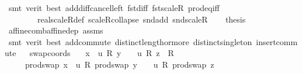 \begin{isabellebody}
\ {\isacharparenleft}{\kern0pt}smt\ {\isacharparenleft}{\kern0pt}verit{\isacharcomma}{\kern0pt}\ best{\isacharparenright}{\kern0pt}\ add{\isacharunderscore}{\kern0pt}diff{\isacharunderscore}{\kern0pt}cancel{\isacharunderscore}{\kern0pt}left{\isacharprime}{\kern0pt}\ fst{\isacharunderscore}{\kern0pt}diff\ fst{\isacharunderscore}{\kern0pt}scaleR\ prod{\isacharunderscore}{\kern0pt}eq{\isacharunderscore}{\kern0pt}iff\ \isanewline
\ \ \ \ \ \ \ \ real{\isacharunderscore}{\kern0pt}scaleR{\isacharunderscore}{\kern0pt}def\ scaleR{\isacharunderscore}{\kern0pt}collapse\ snd{\isacharunderscore}{\kern0pt}add\ snd{\isacharunderscore}{\kern0pt}scaleR{\isacharparenright}{\kern0pt}\isanewline
\ \ \isamarkupfalse%
\ {\isacharquery}{\kern0pt}thesis\ \isamarkupfalse%
\ affine{\isacharunderscore}{\kern0pt}comb{\isacharunderscore}{\kern0pt}affine{\isacharunderscore}{\kern0pt}dep\ assms{\isacharparenleft}{\kern0pt}{}{\isacharparenright}{\kern0pt}\isanewline
\ \ \ \ \isamarkupfalse%
\ {\isacharparenleft}{\kern0pt}smt\ {\isacharparenleft}{\kern0pt}verit{\isacharcomma}{\kern0pt}\ best{\isacharparenright}{\kern0pt}\ add{\isachardot}{\kern0pt}commute\ distinct{\isacharunderscore}{\kern0pt}length{\isacharunderscore}{\kern0pt}{}{\isacharunderscore}{\kern0pt}or{\isacharunderscore}{\kern0pt}more\ distinct{\isacharunderscore}{\kern0pt}singleton\ insert{\isacharunderscore}{\kern0pt}commute{\isacharparenright}{\kern0pt}\isanewline
{}\isamarkupfalse%
%
\endisatagproof
{\isafoldproof}%
%
\isadelimproof
\ \isanewline
%
\endisadelimproof
\isanewline
{}\isamarkupfalse%
\ swap{\isacharunderscore}{\kern0pt}coords{\isacharcolon}{\kern0pt}\isanewline
\ \ \ {\isachardoublequoteopen}x\ {\isacharequal}{\kern0pt}\ u\ {\isacharasterisk}{\kern0pt}\isactrlsub R\ y\ {\isacharplus}{\kern0pt}\ {\isacharparenleft}{\kern0pt}{}\ {\isacharminus}{\kern0pt}\ u{\isacharparenright}{\kern0pt}\ {\isacharasterisk}{\kern0pt}\isactrlsub R\ {\isacharparenleft}{\kern0pt}z\ {\isacharcolon}{\kern0pt}{\isacharcolon}{\kern0pt}\ R{}{\isacharparenright}{\kern0pt}{\isachardoublequoteclose}\isanewline
\ \ \ \ \ {\isachardoublequoteopen}prod{\isachardot}{\kern0pt}swap\ x\ {\isacharequal}{\kern0pt}\ u\ {\isacharasterisk}{\kern0pt}\isactrlsub R\ prod{\isachardot}{\kern0pt}swap\ y\ {\isacharplus}{\kern0pt}\ {\isacharparenleft}{\kern0pt}{}\ {\isacharminus}{\kern0pt}\ u{\isacharparenright}{\kern0pt}\ {\isacharasterisk}{\kern0pt}\isactrlsub R\ prod{\isachardot}{\kern0pt}swap\ z{\isachardoublequoteclose}\isanewline

\end{isabellebody}
